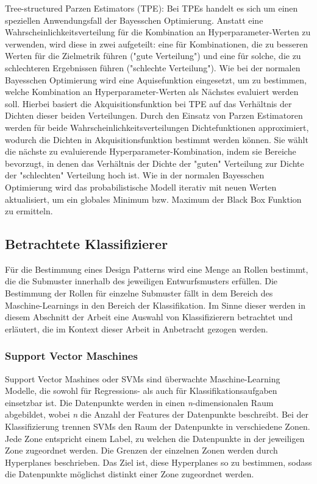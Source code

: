 \begin{description}
    \item Tree-structured Parzen Estimators (TPE): Bei TPEs handelt es sich um einen speziellen Anwendungsfall der Bayesschen Optimierung. Anstatt eine Wahrscheinlichkeitsverteilung für die Kombination an Hyperparameter-Werten zu verwenden, wird diese in zwei aufgeteilt:
    eine für Kombinationen, die zu besseren Werten für die Zielmetrik führen ("gute Verteilung") und eine für solche, die zu schlechteren Ergebnissen führen ("schlechte Verteilung"). Wie bei der normalen Bayesschen Optimierung wird eine Aquisefunktion eingesetzt, um zu bestimmen, welche Kombination an Hyperparameter-Werten als Nächstes evaluiert werden soll.
    Hierbei basiert die Akquisitionsfunktion bei TPE auf das Verhältnis der Dichten dieser beiden Verteilungen. Durch den Einsatz von Parzen Estimatoren werden für beide Wahrscheinlichkeitsverteilungen Dichtefunktionen approximiert, wodurch die Dichten in Akquisitionsfunktion bestimmt werden können.
    Sie wählt die nächste zu evaluierende Hyperparameter-Kombination, indem sie Bereiche bevorzugt, in denen das Verhältnis der Dichte der "guten" Verteilung zur Dichte der "schlechten" Verteilung hoch ist.
    Wie in der normalen Bayesschen Optimierung wird das probabilistische Modell iterativ mit neuen Werten aktualisiert, um ein globales Minimum bzw. Maximum der Black Box Funktion zu ermitteln.

\end{description}

\pagebreak

\subsection{Betrachtete Klassifizierer} \label{classifiers}
Für die Bestimmung eines Design Patterns wird eine Menge an Rollen bestimmt, die die Submuster innerhalb des jeweiligen Entwurfsmusters erfüllen.
Die Bestimmung der Rollen für einzelne Submuster fällt in dem Bereich des Maschine-Learnings in den Bereich der Klassifikation. Im Sinne dieser werden in diesem Abschnitt der Arbeit eine Auswahl von Klassifizierern betrachtet und erläutert,
die im Kontext dieser Arbeit in Anbetracht gezogen werden.

\subsubsection*{Support Vector Maschines}

Support Vector Mashines oder SVMs sind überwachte Maschine-Learning Modelle, die sowohl für Regressions- als auch für Klassifikationsaufgaben einsetzbar ist. Die Datenpunkte werden in einen \textit{n}-dimensionalen Raum abgebildet, wobei \textit{n} die Anzahl der Features der Datenpunkte beschreibt.
Bei der Klassifizierung trennen SVMs den Raum der Datenpunkte in verschiedene Zonen. Jede Zone entspricht einem Label, zu welchen die Datenpunkte in der jeweiligen Zone zugeordnet werden. Die Grenzen der einzelnen Zonen werden durch Hyperplanes beschrieben. Das Ziel ist, diese Hyperplanes so zu bestimmen,
sodass die Datenpunkte möglichst distinkt einer Zone zugeordnet werden.


